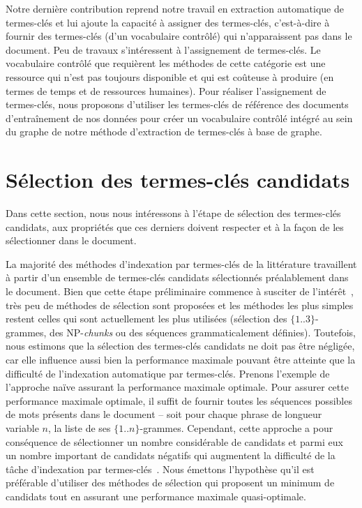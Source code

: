     Notre dernière contribution reprend notre travail en extraction automatique
    de termes-clés et lui ajoute la capacité à assigner des termes-clés,
    c'est-à-dire à fournir des termes-clés (d'un vocabulaire contrôlé) qui
    n'apparaissent pas dans le document. Peu de travaux s'intéressent à
    l'assignement de termes-clés. Le vocabulaire contrôlé que requièrent les
    méthodes de cette catégorie est une ressource qui n'est pas toujours
    disponible et qui est coûteuse à produire (en termes de temps et de
    ressources humaines). Pour réaliser l'assignement de termes-clés, nous
    proposons d'utiliser les termes-clés de référence des documents
    d'entraînement de nos données pour créer un vocabulaire contrôlé intégré au
    sein du graphe de notre méthode d'extraction de termes-clés à base de
    graphe.


  \section{Sélection des termes-clés candidats}
  \label{sec:main-automatic_keyphrase_annotation-keyphrase_candidate_selection}
    Dans cette section, nous nous intéressons à l'étape de sélection des
    termes-clés candidats, aux propriétés que ces derniers doivent respecter et
    à la façon de les sélectionner dans le document.

    La majorité des méthodes d'indexation par termes-clés de la littérature
    travaillent à partir d'un ensemble de termes-clés candidats sélectionnés
    préalablement dans le document. Bien que cette étape préliminaire commence à
    susciter de l'intérêt~\cite{wang2014keyphraseextractionpreprocessing}, très
    peu de méthodes de sélection sont proposées et les méthodes les plus simples
    restent celles qui sont actuellement les plus utilisées (sélection des
    $\{1..3\}$-grammes, des NP-\textit{chunks} ou des séquences grammaticalement
    définies). Toutefois, nous estimons que la sélection des termes-clés
    candidats ne doit pas être négligée, car elle influence aussi bien la
    performance maximale pouvant être atteinte que la difficulté de l'indexation
    automatique par termes-clés. Prenons l'exemple de l'approche naïve assurant
    la performance maximale optimale. Pour assurer cette performance maximale
    optimale, il suffit de fournir toutes les séquences possibles de mots
    présents dans le document -- soit pour chaque phrase de longueur
    variable $n$, la liste de ses $\{1..n\}$-grammes. Cependant, cette
    approche a pour conséquence de sélectionner un nombre considérable de
    candidats et parmi eux un nombre important de candidats négatifs qui
    augmentent la difficulté de la tâche d'indexation par
    termes-clés~\cite{hasan2014state_of_the_art}. Nous émettons l'hypothèse
    qu'il est préférable d'utiliser des méthodes de sélection qui proposent un
    minimum de candidats tout en assurant une performance maximale
    quasi-optimale.

